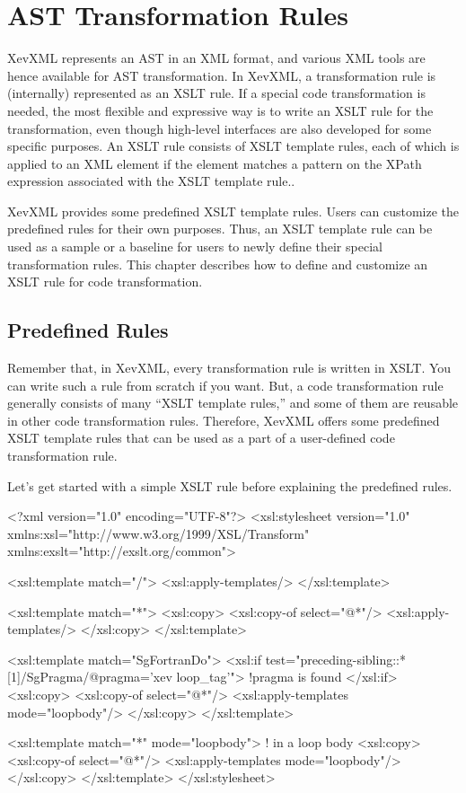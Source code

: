 \chapter{AST Transformation Rules}\label{chap:xslt}

XevXML represents an AST in an XML format, and various XML tools are
hence available for AST transformation. In XevXML, a transformation rule
is (internally) represented as an XSLT rule. If a special code
transformation is needed, the most flexible and expressive way is to
write an XSLT rule for the transformation, even though high-level
interfaces are also developed for some specific purposes. An XSLT rule
consists of XSLT template rules, each of which is applied to an XML
element if the element matches a pattern on the XPath expression
associated with the XSLT template rule..

XevXML provides some predefined XSLT template rules.  Users can
customize the predefined rules for their own purposes.  Thus, an XSLT
template rule can be used as a sample or a baseline for users to newly
define their special transformation rules.  This chapter describes how
to define and customize an XSLT rule for code transformation.


\section{Predefined Rules}\label{sec:predef}
Remember that, in XevXML, every transformation rule is written in
XSLT. You can write such a rule from scratch if you want.  But, a code
transformation rule generally consists of many ``XSLT template rules,''
and some of them are reusable in other code transformation rules.
Therefore, XevXML offers some predefined XSLT template rules that can be
used as a part of a user-defined code transformation rule.

Let's get started with a simple XSLT rule before explaining the
predefined rules.
\begin{framed}
\begin{src}
<?xml version="1.0" encoding="UTF-8"?>
<xsl:stylesheet version="1.0"
   xmlns:xsl="http://www.w3.org/1999/XSL/Transform"
   xmlns:exslt="http://exslt.org/common">

  <xsl:template match="/">
    <xsl:apply-templates/>
  </xsl:template>

  <xsl:template match="*">
    <xsl:copy>
      <xsl:copy-of select="@*"/>
      <xsl:apply-templates/>
    </xsl:copy>
  </xsl:template>

  <xsl:template match="SgFortranDo">
    <xsl:if test="preceding-sibling::*[1]/SgPragma/@pragma='xev loop_tag'">
      !pragma is found
    </xsl:if>
    <xsl:copy>
      <xsl:copy-of select="@*"/>
      <xsl:apply-templates mode="loopbody"/>
    </xsl:copy>
  </xsl:template>

  <xsl:template match="*" mode="loopbody">
    ! in a loop body
    <xsl:copy>
      <xsl:copy-of select="@*"/>
      <xsl:apply-templates mode="loopbody"/>
    </xsl:copy>
  </xsl:template>
</xsl:stylesheet>
\end{src}
\end{framed}


